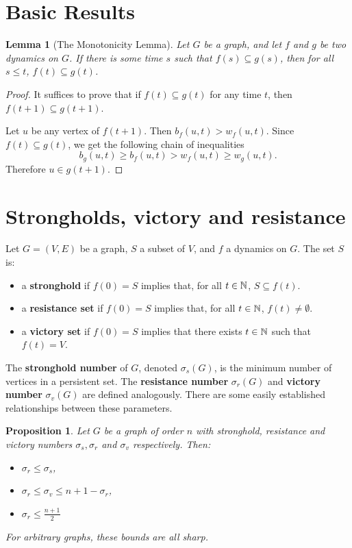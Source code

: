 \documentclass{article}
\def\N{\ensuremath\mathbb{N}}
\theoremstyle{plain}
\newtheorem{lem}[thm]{Lemma}
\newtheorem{prop}[thm]{Proposition}
\theoremstyle{definition}
\begin{document}
\section{Basic Results}

\begin{lem}[The Monotonicity Lemma]
	Let $G$ be a graph, and let $f$ and $g$ be two dynamics on $G$. 
	If there is some time $s$ such that $f(s) \subseteq g(s)$, then for all $s \leq t$, $f(t) \subseteq g(t)$.
	\label{lem_monotonicity_lem}
\end{lem}

\begin{proof}
	It suffices to prove that if $f(t) \subseteq g(t)$ for any time $t$, then $f(t+1) \subseteq g(t+1)$.
	
	Let $u$ be any vertex of $f(t+1)$. 
	Then $b_f(u,t) > w_f(u,t)$.
	Since $f(t) \subseteq g(t)$, we get the following chain of inequalities
	\[
		b_g(u,t) \geq b_f(u,t) > w_f(u,t) \geq w_g(u,t).
	\] 
	Therefore $u\in g(t+1)$.
\end{proof}

\section{Strongholds, victory and resistance}

Let $G = (V,E)$ be a graph, $S$ a subset of $V$, and $f$ a dynamics on $G$. The set $S$ is:
\begin{itemize}
	\item a \textbf{stronghold} if $f(0) = S$ implies that, for all $t\in \N$, $S \subseteq f(t)$.
	\item a \textbf{resistance set} if $f(0) = S$ implies that, for all $t\in \N$, $f(t) \neq \emptyset$.
	\item a \textbf{victory set} if $f(0) = S$ implies that there exists $t\in \N$ such that $f(t) = V$.
\end{itemize}

The \textbf{stronghold number} of $G$, denoted $\sigma_s(G)$, is the minimum number of vertices in a persistent set. The \textbf{resistance number} $\sigma_r(G)$ and \textbf{victory number} $\sigma_v(G)$ are defined analogously. There are some easily established relationships between these parameters.

\begin{prop}
	Let $G$ be a graph of order $n$ with stronghold, resistance and victory numbers $\sigma_s, \sigma_r$ and $\sigma_v$ respectively. Then:
	\begin{itemize}
		\item[(1)] $\sigma_r \leq \sigma_s$,
		\item[(2)] $\sigma_r \leq \sigma_v \leq n+1 - \sigma_r$,
		\item[(3)] $\sigma_r \leq \frac{n+1}{2}$
	\end{itemize}
	For arbitrary graphs, these bounds are all sharp.
	\label{prop_sigma_bounds}
\end{prop}
\end{document}
